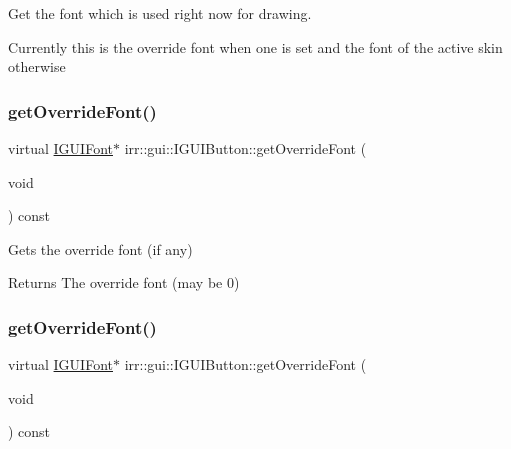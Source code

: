 Get the font which is used right now for drawing. 

Currently this is the override font when one is set and the font of the active skin otherwise \mbox{\label{classirr_1_1gui_1_1IGUIButton_adbc27c7589bf22d2a7fa676401358578}} 
\subsubsection{\texorpdfstring{get\+Override\+Font()}{getOverrideFont()}\hspace{0.1cm}{\footnotesize\ttfamily [1/2]}}
{\footnotesize\ttfamily virtual \hyperlink{classirr_1_1gui_1_1IGUIFont}{I\+G\+U\+I\+Font}$\ast$ irr\+::gui\+::\+I\+G\+U\+I\+Button\+::get\+Override\+Font (\begin{DoxyParamCaption}\item[{void}]{ }\end{DoxyParamCaption}) const\hspace{0.3cm}{\ttfamily [pure virtual]}}



Gets the override font (if any) 

\begin{DoxyReturn}{Returns}
The override font (may be 0) 
\end{DoxyReturn}
\mbox{\label{classirr_1_1gui_1_1IGUIButton_adbc27c7589bf22d2a7fa676401358578}} 
\subsubsection{\texorpdfstring{get\+Override\+Font()}{getOverrideFont()}\hspace{0.1cm}{\footnotesize\ttfamily [2/2]}}
{\footnotesize\ttfamily virtual \hyperlink{classirr_1_1gui_1_1IGUIFont}{I\+G\+U\+I\+Font}$\ast$ irr\+::gui\+::\+I\+G\+U\+I\+Button\+::get\+Override\+Font (\begin{DoxyParamCaption}\item[{void}]{ }\end{DoxyParamCaption}) const\hspace{0.3cm}{\ttfamily [pure virtual]}}



